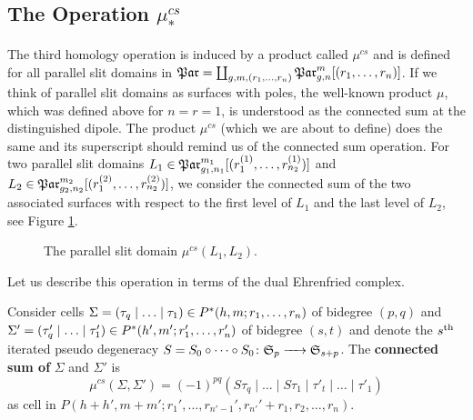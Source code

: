 \subsection{The Operation \texorpdfstring{$\mu^{cs}_\ast$}{muconnected_sum*}}
\label{homology_operations:parallel_patching_slit_pics:construction_of_mu_cs}
The third homology operation is induced by a product called $\mu^{cs}$
\label{page:shorthand_par}%
and is defined for all parallel slit domains in $\Par = \coprod_{g,m,(r_1,\ldots, r_n)}\Parr$.
If we think of parallel slit domains as surfaces with poles, the well-known product $\mu$, which was defined above for $n=r=1$,
is understood as the connected sum at the distinguished dipole.
The product $\mu^{cs}$ (which we are about to define) does the same and its superscript should remind us of the connected sum operation.
For two parallel slit domains $L_1 \in \Par_{g_1,n_1}^{m_1}[(r^{(1)}_1, \ldots, r^{(1)}_{n_2})]$ and $L_2 \in \Par_{g_2,n_2}^{m_2}[(r^{(2)}_1, \ldots, r^{(2)}_{n_2})]$,
we consider the connected sum of the two associated surfaces with respect to the first level of $L_1$ and the last level of $L_2$, see Figure \ref{homology_operations:parallel_patching_slit_pics:mu_cs}.
\begin{figure}[ht]
    \centering
    \def\svgwidth{.3\columnwidth}
    
    \caption{\label{homology_operations:parallel_patching_slit_pics:mu_cs}The parallel slit domain $\mu^{cs}(L_1, L_2)$.}
\end{figure}

Let us describe this operation in terms of the dual Ehrenfried complex.
\begin{defi}
    \label{homology_operations:parallel_patching_slit_pics:connected_sum}
    Consider cells $\Sigma = \inhomq[\tau] \in P^\ast(h,m; r_1, \ldots, r_n)$ of bidegree $(p,q)$ and $\Sigma' = \inhomq[\tau'] \in P^\ast(h',m';r'_1, \ldots, r'_n)$ of bidegree $(s, t)$
    and denote the $s^{\text{th}}$ iterated pseudo degeneracy $S = S_0 \circ \cdots \circ S_0 \colon \mathfrak S_{p} \xrightarrow{\hspace{6pt}{}\hspace{6pt}} \mathfrak S_{s+p}$.
    The {\bfseries connected sum of} $\Sigma$ and $\Sigma'$ is
    \[
        \mu^{cs}(\Sigma, \Sigma') = (-1)^{pq} (S\tau_q \mid \ldots \mid S\tau_1 \mid \tau'_t \mid \ldots \mid \tau'_1)
    \]
    as cell in $P(h+h',m+m'; r_1', \ldots, r_{n'-1}', r_{n'}' + r_1, r_2, \ldots, r_n)$.
\end{defi}

